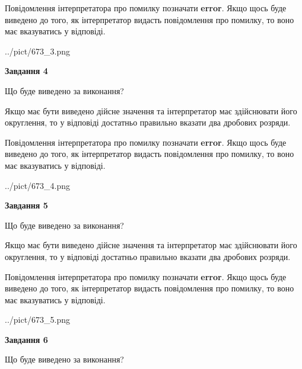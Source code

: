 \documentclass[12pt, ukrainian]{article}
\begin{document}
{\begin {Large}
Повідомлення інтерпретатора про помилку позначати \textbf{error}.
Якщо щось буде виведено до того, як інтерпретатор видасть повідомлення про помилку, 
то воно має вказуватись у відповіді. \par

\begin{center}
	{../pict/673_3.png}
\end{center}
\newpage

{\begin {center}\textbf{Завдання 4}\end {center}}\par
Що буде виведено за виконання? \par

Якщо має бути виведено дійсне значення та інтерпретатор має здійснювати його округлення, 
то у відповіді достатньо правильно вказати два дробових розряди.

Повідомлення інтерпретатора про помилку позначати \textbf{error}.
Якщо щось буде виведено до того, як інтерпретатор видасть повідомлення про помилку, 
то воно має вказуватись у відповіді. \par

\begin{center}
	{../pict/673_4.png}
\end{center}
\newpage

{\begin {center}\textbf{Завдання 5}\end {center}}\par
Що буде виведено за виконання? \par

Якщо має бути виведено дійсне значення та інтерпретатор має здійснювати його округлення, 
то у відповіді достатньо правильно вказати два дробових розряди.

Повідомлення інтерпретатора про помилку позначати \textbf{error}.
Якщо щось буде виведено до того, як інтерпретатор видасть повідомлення про помилку, 
то воно має вказуватись у відповіді. \par

\begin{center}
	{../pict/673_5.png}
\end{center}
\newpage

{\begin {center}\textbf{Завдання 6}\end {center}}\par
Що буде виведено за виконання? \par


\end{Large}}
\end{document}
